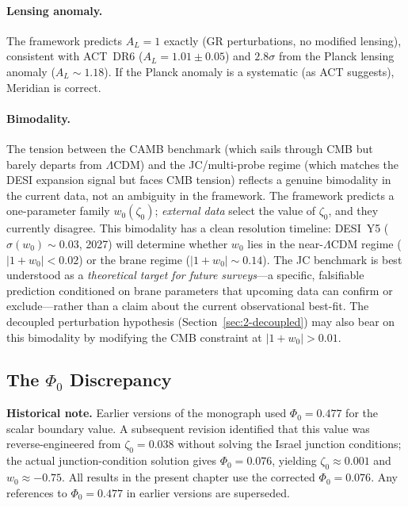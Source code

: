 \paragraph{Lensing anomaly.} The framework predicts $A_L = 1$ exactly (GR perturbations, no modified lensing), consistent with ACT~DR6 ($A_L = 1.01 \pm 0.05$) and $2.8\sigma$ from the Planck lensing anomaly ($A_L \sim 1.18$). If the Planck anomaly is a systematic (as ACT suggests), Meridian is correct.

\paragraph{Bimodality.} The tension between the CAMB benchmark (which sails through CMB but barely departs from $\Lambda$CDM) and the JC/multi-probe regime (which matches the DESI expansion signal but faces CMB tension) reflects a genuine bimodality in the current data, not an ambiguity in the framework. The framework predicts a one-parameter family $w_0(\zeta_0)$; \emph{external data} select the value of $\zeta_0$, and they currently disagree.  This bimodality has a clean resolution timeline: DESI~Y5 ($\sigma(w_0) \sim 0.03$, 2027) will determine whether $w_0$ lies in the near-$\Lambda$CDM regime ($|1+w_0| < 0.02$) or the brane regime ($|1+w_0| \sim 0.14$).  The JC benchmark is best understood as a \emph{theoretical target for future surveys}---a specific, falsifiable prediction conditioned on brane parameters that upcoming data can confirm or exclude---rather than a claim about the current observational best-fit. The decoupled perturbation hypothesis (Section~\ref{sec:2-decoupled}) may also bear on this bimodality by modifying the CMB constraint at $|1+w_0| > 0.01$.

\subsection{The $\Phi_0$ Discrepancy}
\label{sec:2-Phi0-note}

\textbf{Historical note.} Earlier versions of the monograph used $\Phi_0 = 0.477$ for the scalar boundary value. A subsequent revision identified that this value was reverse-engineered from $\zeta_0 = 0.038$ without solving the Israel junction conditions; the actual junction-condition solution gives $\Phi_0 = 0.076$, yielding $\zeta_0 \approx 0.001$ and $w_0 \approx -0.75$. All results in the present chapter use the corrected $\Phi_0 = 0.076$. Any references to $\Phi_0 = 0.477$ in earlier versions are superseded.

